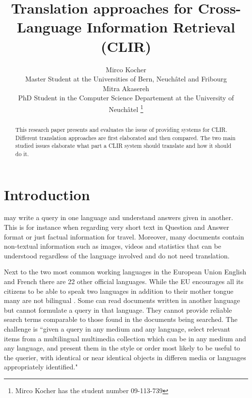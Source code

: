 \documentclass[journal]{IEEEtran}
\begin{document}
\title{ Translation approaches for Cross-Language Information
Retrieval (CLIR)}

\author{Mirco Kocher\\
Master Student at the Universities of Bern, Neuch\^{a}tel and Fribourg\\
Mitra Akasereh\\
PhD Student in the Computer Science Departement at the University of Neuch\^{a}tel
\thanks{Mirco Kocher has the student number 09-113-739} %
}


\maketitle


\begin{abstract}
This research paper presents and evaluates the issue of providing systems for CLIR.
Different translation approaches are first elaborated and then compared.
The two main studied issues elaborate what part a CLIR system should translate and how it should do it.
\end{abstract}


\section{Introduction}
 may write a query in one language and understand answers given in another.
This is for instance when regarding very short text in Question and Answer format or just factual information for travel.
Moreover, many documents contain non-textual information such as images, videos and statistics that can be understood regardless of the language involved and do not need translation.

Next to the two most common working languages in the European Union English and French there are 22 other official languages.
While the EU encourages all its citizens to be able to speak two languages in addition to their mother tongue many  are not bilingual \cite{ebs386}.
Some can read documents written in another language but cannot formulate a query in that language.
They cannot provide reliable search terms comparable to those found in the documents being searched.
The challenge is ``given a query in any medium and any language, select relevant items from a multilingual multimedia collection which can be in any medium and any language, and present them in the style or order most likely to be useful to the querier, with identical or near identical objects in differen media or languages appropriately identified." \cite{oard97a}
\end{document}
